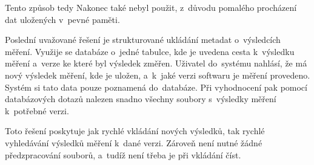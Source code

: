 Tento způsob tedy Nakonec také nebyl použit, z~důvodu pomalého procházení dat uložených v~pevné paměti.

Poslední uvažované řešení je strukturované ukládání metadat o~výsledcích měření. Využije se databáze o~jedné tabulce, kde
je uvedena cesta k~výsledku měření a~verze ke které byl výsledek změřen. Uživatel do~systému nahlásí, že má nový výsledek
měření, kde je uložen, a~k~jaké verzi softwaru je měření provedeno. Systém si tato data pouze poznamená do~databáze. Při
vyhodnocení pak pomocí databázových dotazů nalezen snadno všechny soubory s~výsledky měření k~potřebné verzi.

Toto řešení poskytuje jak rychlé vkládání nových výsledků, tak rychlé vyhledávání výsledků měření k~dané verzi. Zároveň
není nutné žádné předzpracování souborů, a~tudíž není třeba je při vkládání číst.